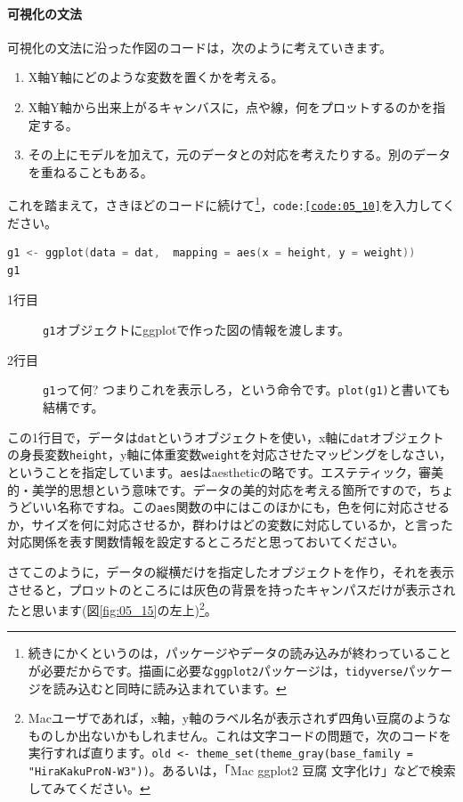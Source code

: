 \documentclass{ltjsbook}
\begin{document}
\paragraph{可視化の文法}
可視化の文法に沿った作図のコードは，次のように考えていきます。
\begin{enumerate}
	\item X軸Y軸にどのような変数を置くかを考える。
	\item X軸Y軸から出来上がるキャンバスに，点や線，何をプロットするのかを指定する。
	\item その上にモデルを加えて，元のデータとの対応を考えたりする。別のデータを重ねることもある。
\end{enumerate}
これを踏まえて，さきほどのコードに続けて\footnote{続きにかくというのは，パッケージやデータの読み込みが終わっていることが必要だからです。描画に必要な\texttt{ggplot2}パッケージは，\texttt{tidyverse}パッケージを読み込むと同時に読み込まれています。}，\texttt{code:\ref{code:05_10}}を入力してください。

\begin{lstlisting}[language=c++,label={code:05_10},caption={まずはキャンパスを設定する}]
g1 <- ggplot(data = dat,  mapping = aes(x = height, y = weight))
g1
\end{lstlisting}

\begin{description}
	\item[1行目] \texttt{g1}オブジェクトにggplotで作った図の情報を渡します。
	\item[2行目] \texttt{g1}って何? つまりこれを表示しろ，という命令です。\texttt{plot(g1)}と書いても結構です。
\end{description}
この1行目で，データは\texttt{dat}というオブジェクトを使い，x軸に\texttt{dat}オブジェクトの身長変数\verb|height|，y軸に体重変数\verb|weight|を対応させたマッピングをしなさい，ということを指定しています。\texttt{aes}はaestheticの略です。エステティック，審美的・美学的思想という意味です。データの美的対応を考える箇所ですので，ちょうどいい名称ですね。この\texttt{aes}関数の中にはこのほかにも，色を何に対応させるか，サイズを何に対応させるか，群わけはどの変数に対応しているか，と言った対応関係を表す関数情報を設定するところだと思っておいてください。

さてこのように，データの縦横だけを指定したオブジェクトを作り，それを表示させると，プロットのところには灰色の背景を持ったキャンパスだけが表示されたと思います(図\ref{fig:05_15}の左上)\footnote{Macユーザであれば，x軸，y軸のラベル名が表示されず四角い豆腐のようなものしか出ないかもしれません。これは文字コードの問題で，次のコードを実行すれば直ります。\verb|old <- theme_set(theme_gray(base_family = "HiraKakuProN-W3"))|。あるいは，「Mac ggplot2 豆腐 文字化け」などで検索してみてください。}。
\end{document}
